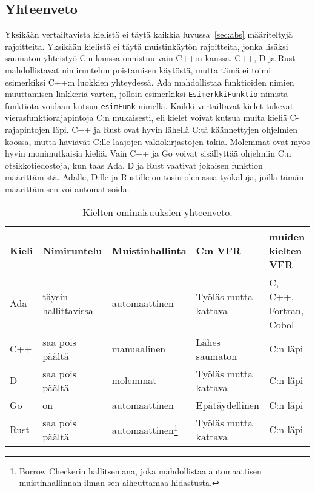\newpage

\subsection{Yhteenveto}

Yksikään vertailtavista kielistä ei täytä kaikkia luvussa~\ref{sec:abs}
määriteltyjä rajoitteita. Yksikään kielistä ei täytä muistinkäytön rajoitteita,
jonka lisäksi saumaton yhteistyö C:n kanssa onnistuu vain C++:n kanssa. C++, D
ja Rust mahdollistavat nimiruntelun poistamisen käytöstä, mutta tämä ei toimi
esimerkiksi C++:n luokkien yhteydessä. Ada mahdollistaa funktioiden nimien
muuttamisen linkkeriä varten, jolloin esimerkiksi
\texttt{EsimerkkiFunktio}-nimistä funktiota voidaan kutsua
\texttt{esimFunk}-nimellä. Kaikki vertailtavat kielet tukevat
vierasfunktiorajapintoja C:n mukaisesti, eli kielet voivat kutsua muita kieliä
C-rajapintojen läpi. C++ ja Rust ovat hyvin lähellä C:tä käännettyjen ohjelmien
koossa, mutta häviävät C:lle laajojen vakiokirjastojen takia. Molemmat ovat
myös hyvin monimutkaisia kieliä. Vain C++ ja Go voivat sisällyttää ohjelmiin
C:n otsikkotiedostoja, kun taas Ada, D ja Rust vaativat jokaisen funktion
määrittämistä. Adalle, D:lle ja Rustille on tosin olemassa työkaluja, joilla
tämän määrittämisen voi automatisoida.

\begin{table}[ht!]
    \begin{adjustbox}{center}
    \begin{tabular}{@{}lllll@{}} \toprule
        Kieli & Nimiruntelu   & Muistinhallinta                                     & C:n VFR               & muiden kielten VFR \\ \midrule
        Ada   & täysin hallittavissa & automaattinen                                       & Työläs mutta kattava  & C, C++, Fortran, Cobol \\
        C++   & saa pois päältä            & manuaalinen                                         & Lähes saumaton        & C:n läpi \\
        D     & saa pois päältä            & molemmat                                            & Työläs mutta kattava  & C:n läpi \\
        Go    & on            & automaattinen                                       & Epätäydellinen        & C:n läpi \\
        Rust  & saa pois päältä & automaattinen\footnote{Borrow Checkerin hallitsemana, joka mahdollistaa automaattisen muistinhallinnan ilman sen aiheuttamaa hidastusta.} & Työläs mutta kattava  & C:n läpi \\ \bottomrule
    \end{tabular}
    \end{adjustbox}
    \caption{
        Kielten ominaisuuksien yhteenveto.
    }
    \label{table:properties}
\end{table}

